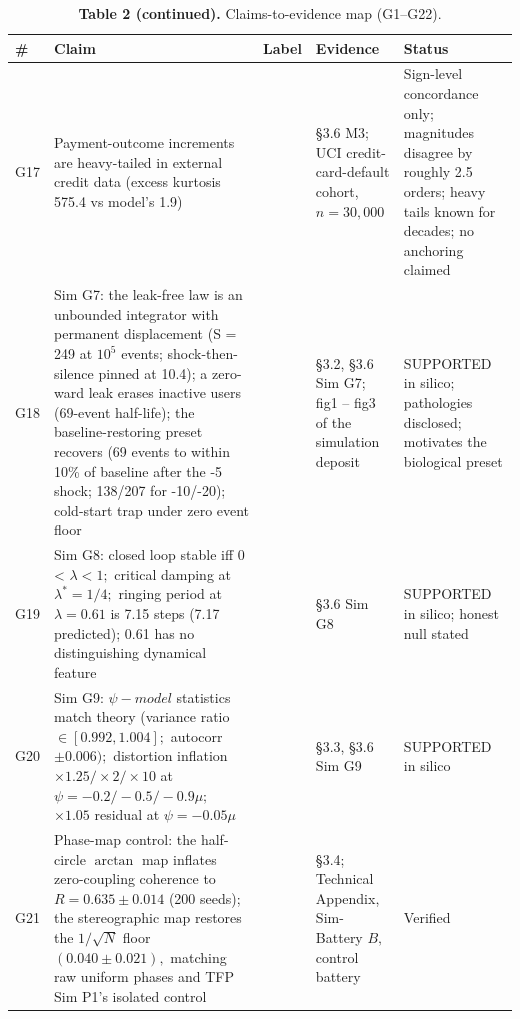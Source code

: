 \documentclass[11pt,twocolumn]{article}
\theoremstyle{gttdef}
\theoremstyle{gttplain}
\begin{document}
\begin{table}[!tb]
\centering\footnotesize
\caption*{\textbf{Table 2 (continued).} Claims-to-evidence map (G1--G22).}
\setlength{\tabcolsep}{4pt}
\begin{tabular}{@{}>{\raggedright\arraybackslash}p{}>{\raggedright\arraybackslash}p{}>{\raggedright\arraybackslash}p{}>{\raggedright\arraybackslash}p{}>{\raggedright\arraybackslash}p{}@{}}
\toprule
\textbf{\#} & \textbf{Claim} & \textbf{Label} & \textbf{Evidence} & \textbf{Status} \\
\midrule
G17 & Payment-outcome increments are heavy-tailed in external credit data (excess kurtosis 575.4 vs model's 1.9) & [EMPIRICAL, associational] & \S{}3.6 M3; UCI credit-card-default cohort, $n = 30,000$ & Sign-level concordance only; magnitudes disagree by roughly 2.5 orders; heavy tails known for decades; no anchoring claimed \\
\addlinespace[3pt]
G18 & Sim G7: the leak-free law is an unbounded integrator with permanent displacement (S = 249 at $10^{5}$ events; shock-then-silence pinned at 10.4); a zero-ward leak erases inactive users (69-event half-life); the baseline-restoring preset recovers (69 events to within 10\% of baseline after the -5 shock; 138/207 for -10/-20); cold-start trap under zero event floor & [SIMULATION] & \S{}3.2, \S{}3.6 Sim G7; fig1 -- fig3 of the simulation deposit & SUPPORTED in silico; pathologies disclosed; motivates the biological preset \\
\addlinespace[3pt]
G19 & Sim G8: closed loop stable iff 0 < $\lambda < 1;$ critical damping at $\lambda^{*} = 1/4;$ ringing period at $\lambda = 0.61$ is 7.15 steps (7.17 predicted); 0.61 has no distinguishing dynamical feature & [SIMULATION] & \S{}3.6 Sim G8 & SUPPORTED in silico; honest null stated \\
\addlinespace[3pt]
G20 & Sim G9: $\psi-model$ statistics match theory (variance ratio $\in [0.992, 1.004];$ autocorr $\pm0.006);$ distortion inflation $\times1.25/\times2/\times10$ at $\psi = -0.2/-0.5/-0.9\mu;$ $\times1.05$ residual at $\psi = -0.05\mu$ & [SIMULATION] & \S{}3.3, \S{}3.6 Sim G9 & SUPPORTED in silico \\
\addlinespace[3pt]
G21 & Phase-map control: the half-circle $\arctan$ map inflates zero-coupling coherence to $R = 0.635 \pm 0.014$ (200 seeds); the stereographic map restores the $1/\sqrt{N}$ floor $(0.040 \pm 0.021),$ matching raw uniform phases and TFP Sim P1's isolated control & [SIMULATION] & \S{}3.4; Technical Appendix, Sim-Battery $B,$ control battery & Verified \\

\end{tabular}
\end{table}
\end{document}
